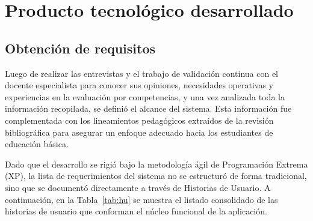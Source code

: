 
\section{Producto tecnológico desarrollado}

\subsection{Obtención de requisitos}
Luego de realizar las entrevistas y el trabajo de validación continua con el docente especialista para conocer sus opiniones, necesidades operativas y experiencias en la evaluación por competencias, y una vez analizada toda la información recopilada, se definió el alcance del sistema. Esta información fue complementada con los lineamientos pedagógicos extraídos de la revisión bibliográfica para asegurar un enfoque adecuado hacia los estudiantes de educación básica.

Dado que el desarrollo se rigió bajo la metodología ágil de Programación Extrema (XP), la lista de requerimientos del sistema no se estructuró de forma tradicional, sino que se documentó directamente a través de Historias de Usuario. A continuación, en la Tabla~\ref{tab:hu} se muestra el listado consolidado de las historias de usuario que conforman el núcleo funcional de la aplicación.

